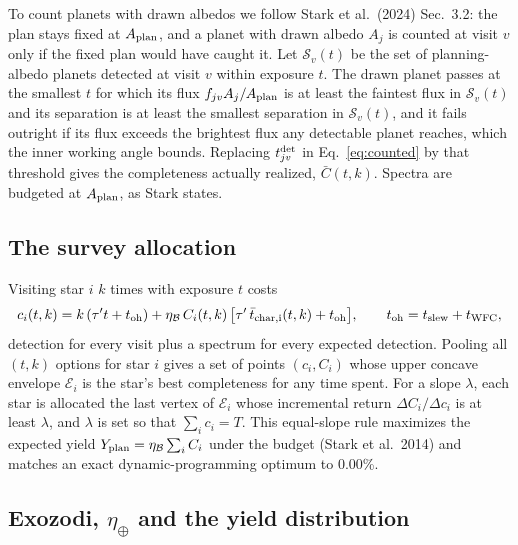 \documentclass[11pt,a4paper]{article}
\begin{document}
To count planets with drawn albedos we follow Stark et al.\ (2024) Sec.~3.2: the plan stays fixed
at $A_{\rm plan}$, and a planet with drawn albedo $A_j$ is counted at visit $v$ only if the fixed
plan would have caught it. Let $\mathcal{S}_v(t)$ be the set of planning-albedo planets detected
at visit $v$ within exposure $t$. The drawn planet passes at the smallest $t$ for which its flux
$f_{jv}A_j/A_{\rm plan}$ is at least the faintest flux in $\mathcal{S}_v(t)$ and its separation is
at least the smallest separation in $\mathcal{S}_v(t)$, and it fails outright if its flux exceeds
the brightest flux any detectable planet reaches, which the inner working angle bounds. Replacing
$t^{\rm det}_{jv}$ in Eq.~\eqref{eq:counted} by that threshold gives the completeness actually
realized, $\bar C(t, k)$. Spectra are budgeted at $A_{\rm plan}$, as Stark states.

\subsection{The survey allocation}

Visiting star $i$ $k$ times with exposure $t$ costs
\begin{equation}
c_i(t, k) = k\,(\tau' t + t_{\rm oh}) +
\eta_\mathcal{B}\,C_i(t, k)\,\big[\tau'\,\bar t_{\rm char,i}(t, k) + t_{\rm oh}\big],
\qquad t_{\rm oh} = t_{\rm slew} + t_{\rm WFC},
\label{eq:cost}
\end{equation}
detection for every visit plus a spectrum for every expected detection. Pooling all
$(t, k)$ options for star $i$ gives a set of points $(c_i, C_i)$ whose upper concave envelope
$\mathcal{E}_i$ is the star's best completeness for any time spent. For a slope $\lambda$, each
star is allocated the last vertex of $\mathcal{E}_i$ whose incremental return
$\Delta C_i/\Delta c_i$ is at least $\lambda$, and $\lambda$ is set so that
$\sum_i c_i = T$. This equal-slope rule maximizes the expected yield
$Y_{\rm plan} = \eta_\mathcal{B}\sum_i C_i$ under the budget (Stark et al.\ 2014) and matches an
exact dynamic-programming optimum to 0.00\%.

\subsection{Exozodi, $\eta_\oplus$ and the yield distribution}
\label{sec:ydist}
\end{document}
